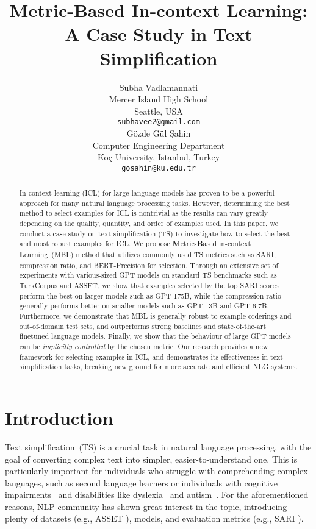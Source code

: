 \documentclass[11pt]{article}
\title{Metric-Based In-context Learning: A Case Study in Text Simplification}
\author{Subha Vadlamannati \\
  Mercer Island High School \\
  Seattle, USA\\
  \texttt{subhavee2@gmail.com} \\\And
  Gözde Gül Şahin \\
  Computer Engineering Department \\
  Koç University, Istanbul, Turkey \\ 
  \texttt{gosahin@ku.edu.tr} }
\begin{document}
 
\maketitle
\begin{abstract}
In-context learning (ICL) for large language models has proven to be a powerful approach for many natural language processing tasks. However, determining the best method to select examples for ICL is nontrivial as the results can vary greatly depending on the quality, quantity, and order of examples used. In this paper, we conduct a case study on text simplification (TS) to investigate how to select the best and most robust examples for ICL. We propose \textbf{M}etric-\textbf{B}ased in-context \textbf{L}earning~(MBL) method that utilizes commonly used TS metrics such as SARI, compression ratio, and BERT-Precision for selection. Through an extensive set of experiments with various-sized GPT models on standard TS benchmarks such as TurkCorpus and ASSET, we show that examples selected by the top SARI scores perform the best on larger models such as GPT-175B, while the compression ratio generally performs better on smaller models such as GPT-13B and GPT-6.7B. Furthermore, we demonstrate that MBL is generally robust to example orderings and out-of-domain test sets, and outperforms strong baselines and state-of-the-art finetuned language models. Finally, we show that the behaviour of large GPT models can be \textit{implicitly controlled} by the chosen metric. Our research provides a new framework for selecting examples in ICL, and demonstrates its effectiveness in text simplification tasks, breaking new ground for more accurate and efficient NLG systems.
\end{abstract}

\section{Introduction}
Text simplification~(TS) is a crucial task in natural language processing, with the goal of converting complex text into simpler, easier-to-understand one. This is particularly important for individuals who struggle with comprehending complex languages, such as second language learners or individuals with cognitive impairments~\citep{stajner-2021-automatic} and disabilities like dyslexia~\citep{10.1145/2461121.2461126} and autism~\citep{autistic}. For the aforementioned reasons, NLP community has shown great interest in the topic, introducing plenty of datasets (e.g., ASSET \citep{alva-manchego-etal-2020-asset}), models, and evaluation metrics (e.g., SARI \citep{xu-etal-2016-optimizing}). 
\end{document}
